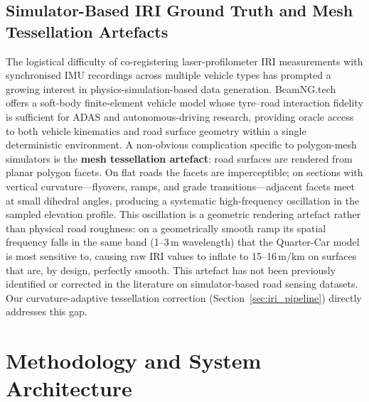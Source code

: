 \documentclass[conference]{IEEEtran}
\begin{document}
\subsection{Simulator-Based IRI Ground Truth and Mesh Tessellation Artefacts}
The logistical difficulty of co-registering laser-profilometer IRI measurements with synchronised IMU recordings across multiple vehicle types has prompted a growing interest in physics-simulation-based data generation.
BeamNG.tech~\cite{15} offers a soft-body finite-element vehicle model whose tyre--road interaction fidelity is sufficient for ADAS and autonomous-driving research, providing oracle access to both vehicle kinematics and road surface geometry within a single deterministic environment.
A non-obvious complication specific to polygon-mesh simulators is the \textbf{mesh tessellation artefact}: road surfaces are rendered from planar polygon facets.
On flat roads the facets are imperceptible; on sections with vertical curvature---flyovers, ramps, and grade transitions---adjacent facets meet at small dihedral angles, producing a systematic high-frequency oscillation in the sampled elevation profile.
This oscillation is a geometric rendering artefact rather than physical road roughness: on a geometrically smooth ramp its spatial frequency falls in the same band (1--3\,m wavelength) that the Quarter-Car model is most sensitive to, causing raw IRI values to inflate to 15--16\,m/km on surfaces that are, by design, perfectly smooth.
This artefact has not been previously identified or corrected in the literature on simulator-based road sensing datasets.
Our curvature-adaptive tessellation correction (Section~\ref{sec:iri_pipeline}) directly addresses this gap.

\section{Methodology and System Architecture}
\end{document}
